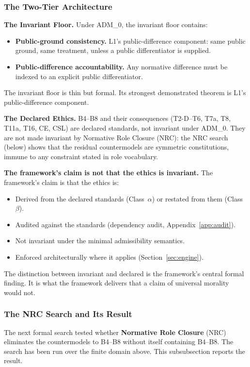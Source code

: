 \documentclass[11pt]{article}
\def\ensuremath#1{#1}%
\def\mathrm#1{#1}%
\newcommand{\ADM}{\texorpdfstring{\ensuremath{\mathrm{ADM}_0}}{ADM0}}
\newcommand{\ca}{\texorpdfstring{Class~$\alpha$}{Class alpha}}
\newcommand{\cb}{\texorpdfstring{Class~$\beta$}{Class beta}}
\begin{document}
\subsubsection{The Two-Tier Architecture}
\begin{paperbox}
\textbf{The Invariant Floor.} Under \ADM{}, the invariant floor contains:
\begin{itemize}
\item \textbf{Public-ground consistency.} L1's public-difference component: same public ground, same treatment, unless a public differentiator is supplied.
\item \textbf{Public-difference accountability.} Any normative difference must be indexed to an explicit public differentiator.
\end{itemize}
The invariant floor is thin but formal. Its strongest demonstrated theorem is L1's public-difference component.

\medskip
\textbf{The Declared Ethics.} B4--B8 and their consequences (T2-D--T6, T7a, T8, T11a, T16, CE, CSL) are declared standards, not invariant under \ADM{}. They are not made invariant by Normative Role Closure (NRC): the NRC search (below) shows that the residual countermodels are symmetric constitutions, immune to any constraint stated in role vocabulary.
\end{paperbox}

\textbf{The framework's claim is not that the ethics is invariant.} The framework's claim is that the ethics is:
\begin{itemize}
\item Derived from the declared standards (\ca{}) or restated from them (\cb{}).
\item Audited against the standards (dependency audit, Appendix~\ref{app:audit}).
\item Not invariant under the minimal admissibility semantics.
\item Enforced architecturally where it applies (Section~\ref{sec:engine}).
\end{itemize}
The distinction between invariant and declared is the framework's central formal finding. It is what the framework delivers that a claim of universal morality would not.

\subsubsection{The NRC Search and Its Result}\label{sec:nrc}
The next formal search tested whether \textbf{Normative Role Closure} (NRC) eliminates the countermodels to B4--B8 without itself containing B4--B8. The search has been run over the finite domain above. This subsubsection reports the result.
\end{document}

